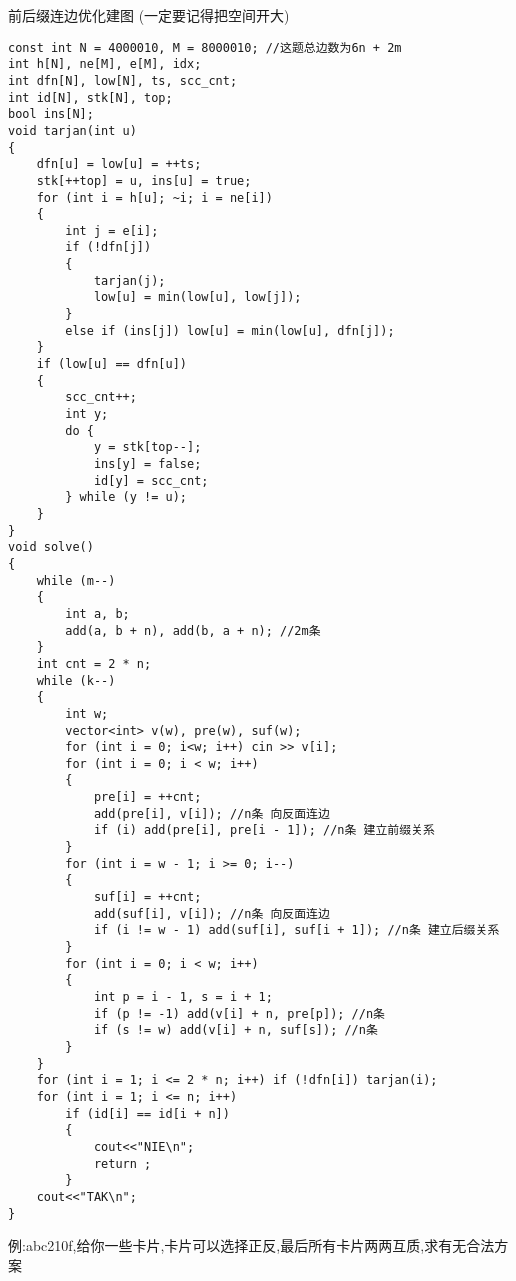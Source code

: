 \documentclass[a4paper, fontset=none]{ctexart}
\begin{document}
前后缀连边优化建图 (一定要记得把空间开大)
\begin{verbatim}
const int N = 4000010, M = 8000010; //这题总边数为6n + 2m
int h[N], ne[M], e[M], idx;
int dfn[N], low[N], ts, scc_cnt;
int id[N], stk[N], top;
bool ins[N];
void tarjan(int u)
{
    dfn[u] = low[u] = ++ts;
    stk[++top] = u, ins[u] = true;
    for (int i = h[u]; ~i; i = ne[i])
    {
        int j = e[i];
        if (!dfn[j])
        {
            tarjan(j);
            low[u] = min(low[u], low[j]);
        }
        else if (ins[j]) low[u] = min(low[u], dfn[j]);
    }
    if (low[u] == dfn[u])
    {
        scc_cnt++;
        int y;
        do {
            y = stk[top--];
            ins[y] = false;
            id[y] = scc_cnt;
        } while (y != u);
    }
}
void solve()
{
    while (m--)
    {
        int a, b;
        add(a, b + n), add(b, a + n); //2m条
    }
    int cnt = 2 * n;
    while (k--)
    {
        int w;
        vector<int> v(w), pre(w), suf(w);
        for (int i = 0; i<w; i++) cin >> v[i];
        for (int i = 0; i < w; i++)
        {
            pre[i] = ++cnt;
            add(pre[i], v[i]); //n条 向反面连边
            if (i) add(pre[i], pre[i - 1]); //n条 建立前缀关系
        }
        for (int i = w - 1; i >= 0; i--)
        {
            suf[i] = ++cnt;
            add(suf[i], v[i]); //n条 向反面连边
            if (i != w - 1) add(suf[i], suf[i + 1]); //n条 建立后缀关系
        }
        for (int i = 0; i < w; i++)
        {
            int p = i - 1, s = i + 1;
            if (p != -1) add(v[i] + n, pre[p]); //n条
            if (s != w) add(v[i] + n, suf[s]); //n条
        }
    }
    for (int i = 1; i <= 2 * n; i++) if (!dfn[i]) tarjan(i);
    for (int i = 1; i <= n; i++)
        if (id[i] == id[i + n])
        {
            cout<<"NIE\n";
            return ;
        }
    cout<<"TAK\n";
}
\end{verbatim}

例:abc210f,给你一些卡片,卡片可以选择正反,最后所有卡片两两互质,求有无合法方案
\end{document}
